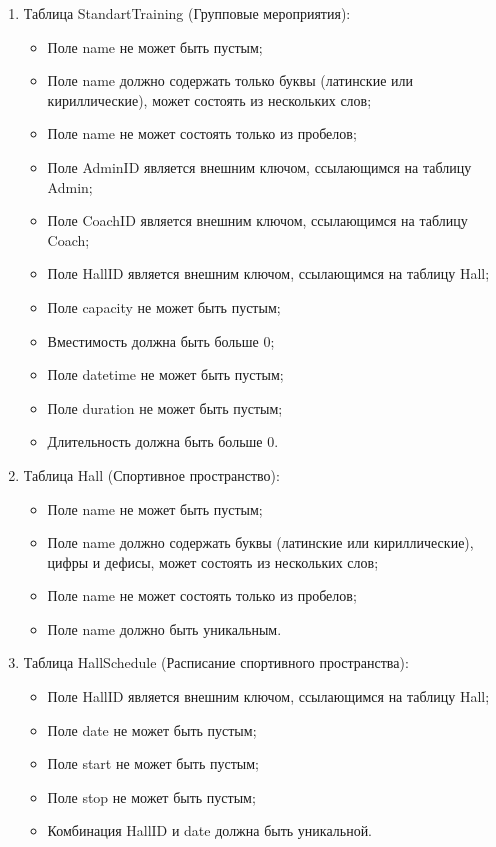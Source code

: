 \begin{enumerate}
    \item Таблица StandartTraining (Групповые мероприятия):
    \begin{itemize}
        \item[---] Поле name не может быть пустым;
        \item[---] Поле name должно содержать только буквы (латинские или кириллические), может состоять из нескольких слов;
        \item[---] Поле name не может состоять только из пробелов;
        \item[---] Поле AdminID является внешним ключом, ссылающимся на таблицу Admin;
        \item[---] Поле CoachID является внешним ключом, ссылающимся на таблицу Coach;
        \item[---] Поле HallID является внешним ключом, ссылающимся на таблицу Hall;
        \item[---] Поле capacity не может быть пустым;
        \item[---] Вместимость должна быть больше 0;
        \item[---] Поле datetime не может быть пустым;
        \item[---] Поле duration не может быть пустым;
        \item[---] Длительность должна быть больше 0.
    \end{itemize}

    \item Таблица Hall (Спортивное пространство):
    \begin{itemize}
        \item[---] Поле name не может быть пустым;
        \item[---] Поле name должно содержать буквы (латинские или кириллические), цифры и дефисы, может состоять из нескольких слов;
        \item[---] Поле name не может состоять только из пробелов;
        \item[---] Поле name должно быть уникальным.
    \end{itemize}

    \item Таблица HallSchedule (Расписание спортивного пространства):
    \begin{itemize}
        \item[---] Поле HallID является внешним ключом, ссылающимся на таблицу Hall;
        \item[---] Поле date не может быть пустым;
        \item[---] Поле start не может быть пустым;
        \item[---] Поле stop не может быть пустым;
        \item[---] Комбинация HallID и date должна быть уникальной.
    \end{itemize}


\end{enumerate}
